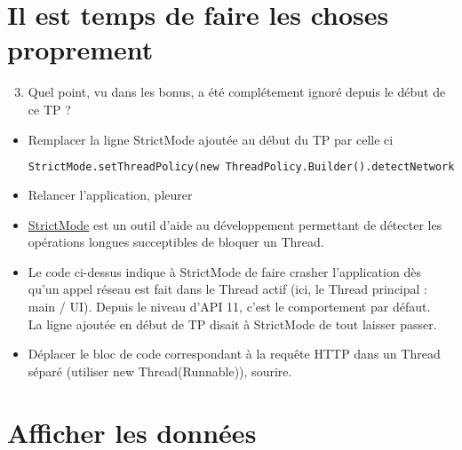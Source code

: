 \documentclass{article}
\begin{document}
\section{Il est temps de faire les choses proprement}
\begin{enumerate}
 \setcounter{enumi}{2}
\item Quel point, vu dans les bonus, a été complétement ignoré depuis le début de ce TP ?
\end{enumerate}
\begin{itemize}
  \item Remplacer la ligne StrictMode ajoutée au début du TP par celle ci
 \begin{lstlisting}[language=XML]
 StrictMode.setThreadPolicy(new ThreadPolicy.Builder().detectNetwork().penaltyDeathOnNetwork().build());
\end{lstlisting} 
  \item Relancer l'application, pleurer
  \item
  \href{http://developer.android.com/reference/android/os/StrictMode.html}{StrictMode}
  est un outil d'aide au développement permettant de détecter les opérations
  longues succeptibles de bloquer un Thread.
  \item Le code ci-dessus indique à StrictMode de faire crasher l'application
  dès qu'un appel réseau est fait dans le Thread actif (ici, le Thread principal
  : main / UI). Depuis le niveau d'API 11, c'est le comportement par défaut.\\La
  ligne ajoutée en début de TP disait à StrictMode de tout laisser passer.
  \item Déplacer le bloc de code correspondant à la requête HTTP dans un Thread
  séparé (utiliser new Thread(Runnable)), sourire.
\end{itemize}
\section{Afficher les données}
\end{document}
